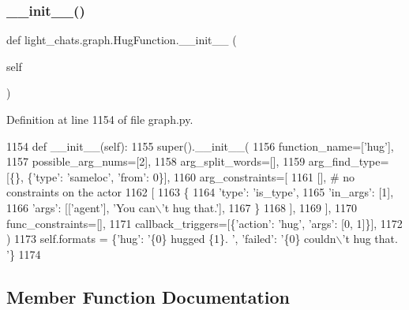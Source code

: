 \subsubsection{\texorpdfstring{\+\_\+\+\_\+init\+\_\+\+\_\+()}{\_\_init\_\_()}}
{\footnotesize\ttfamily def light\+\_\+chats.\+graph.\+Hug\+Function.\+\_\+\+\_\+init\+\_\+\+\_\+ (\begin{DoxyParamCaption}\item[{}]{self }\end{DoxyParamCaption})}



Definition at line 1154 of file graph.\+py.


\begin{DoxyCode}
1154     \textcolor{keyword}{def }\_\_init\_\_(self):
1155         super().\_\_init\_\_(
1156             function\_name=[\textcolor{stringliteral}{'hug'}],
1157             possible\_arg\_nums=[2],
1158             arg\_split\_words=[],
1159             arg\_find\_type=[\{\}, \{\textcolor{stringliteral}{'type'}: \textcolor{stringliteral}{'sameloc'}, \textcolor{stringliteral}{'from'}: 0\}],
1160             arg\_constraints=[
1161                 [],  \textcolor{comment}{# no constraints on the actor}
1162                 [
1163                     \{
1164                         \textcolor{stringliteral}{'type'}: \textcolor{stringliteral}{'is\_type'},
1165                         \textcolor{stringliteral}{'in\_args'}: [1],
1166                         \textcolor{stringliteral}{'args'}: [[\textcolor{stringliteral}{'agent'}], \textcolor{stringliteral}{'You can\(\backslash\)'t hug that.'}],
1167                     \}
1168                 ],
1169             ],
1170             func\_constraints=[],
1171             callback\_triggers=[\{\textcolor{stringliteral}{'action'}: \textcolor{stringliteral}{'hug'}, \textcolor{stringliteral}{'args'}: [0, 1]\}],
1172         )
1173         self.formats = \{\textcolor{stringliteral}{'hug'}: \textcolor{stringliteral}{'\{0\} hugged \{1\}. '}, \textcolor{stringliteral}{'failed'}: \textcolor{stringliteral}{'\{0\} couldn\(\backslash\)'t hug that. '}\}
1174 
\end{DoxyCode}


\subsection{Member Function Documentation}
\mbox{\label{classlight__chats_1_1graph_1_1HugFunction_a581fcc58cb0a76a19a02d8c87d911fb9}} 
